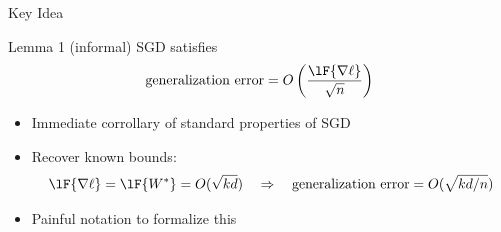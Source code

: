 \begin{frame}{Key Idea}

\begin{block}{Lemma 1 (informal)}
SGD satisfies
\begin{equation}
\text{generalization error} = O\left( \frac{\lF{\nabla \ell}}{\sqrt n} \right)
\end{equation}
\end{block}

\begin{itemize}
\item
Immediate corrollary of standard properties of SGD

\citep{shalev2014understanding}

\vspace{0.2in}
\item Recover known bounds:
\begin{equation*}
\lF{\nabla\ell} = \lF{W^*} = O(\sqrt{kd})
\quad\Rightarrow\quad
\text{generalization error} = O(\sqrt{kd/n})
\end{equation*}

\vspace{0.2in}
\item
Painful notation to formalize this


\end{itemize}

 {
    \begin{center}
    \vspace{-3.45in}
    \setlength{\fboxsep}{0pt}%
    \setlength{\fboxrule}{1pt}%
    \end{center}
}
 {~}

\end{frame}

